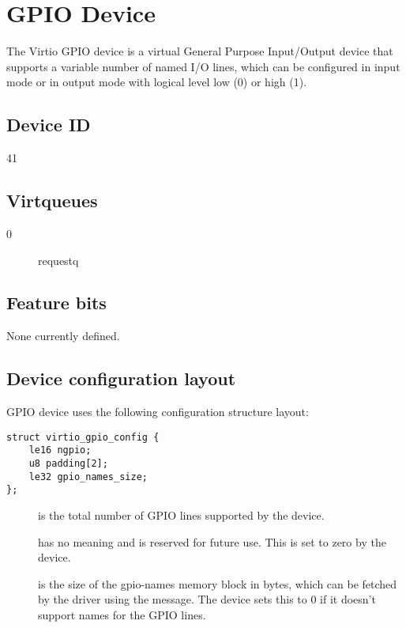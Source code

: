 \section{GPIO Device}\label{sec:Device Types / GPIO Device}

The Virtio GPIO device is a virtual General Purpose Input/Output device that
supports a variable number of named I/O lines, which can be configured in input
mode or in output mode with logical level low (0) or high (1).

\subsection{Device ID}\label{sec:Device Types / GPIO Device / Device ID}
41

\subsection{Virtqueues}\label{sec:Device Types / GPIO Device / Virtqueues}

\begin{description}
\item[0] requestq
\end{description}

\subsection{Feature bits}\label{sec:Device Types / GPIO Device / Feature bits}

None currently defined.

\subsection{Device configuration layout}\label{sec:Device Types / GPIO Device / Device configuration layout}

GPIO device uses the following configuration structure layout:

\begin{lstlisting}
struct virtio_gpio_config {
    le16 ngpio;
    u8 padding[2];
    le32 gpio_names_size;
};
\end{lstlisting}

\begin{description}
\item[] is the total number of GPIO lines supported by the device.

\item[] has no meaning and is reserved for future use. This is
    set to zero by the device.

\item[] is the size of the gpio-names memory block in
    bytes, which can be fetched by the driver using the
     message. The device sets this to
    0 if it doesn't support names for the GPIO lines.
\end{description}


